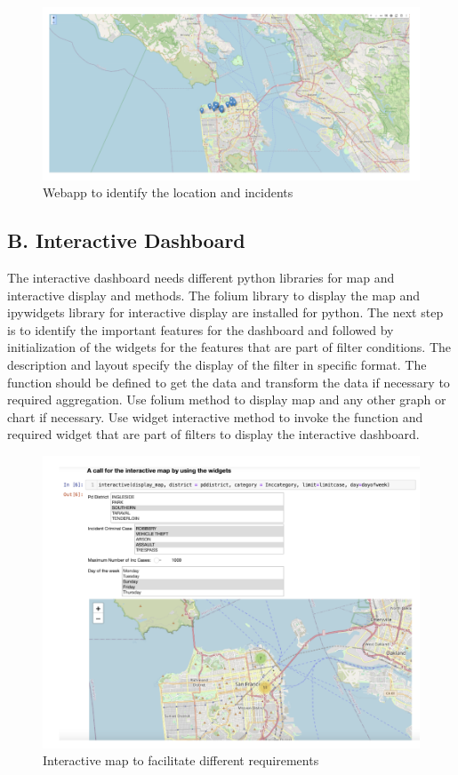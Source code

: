 \documentclass[conference,final,]{IEEEtran}
\begin{document}
\begin{figure}

{\centering \includegraphics[width=0.5\linewidth]{img/fig14a} 

}

\caption{Webapp to identify the location and incidents}\label{fig:unnamed-chunk-17}
\end{figure}

\subsection{B. Interactive Dashboard}\label{b.-interactive-dashboard}

The interactive dashboard needs different python libraries for map and
interactive display and methods. The folium library to display the map
and ipywidgets library for interactive display are installed for python.
The next step is to identify the important features for the dashboard
and followed by initialization of the widgets for the features that are
part of filter conditions. The description and layout specify the
display of the filter in specific format. The function should be defined
to get the data and transform the data if necessary to required
aggregation. Use folium method to display map and any other graph or
chart if necessary. Use widget interactive method to invoke the function
and required widget that are part of filters to display the interactive
dashboard.

\begin{figure}

{\centering \includegraphics[width=0.5\linewidth]{img/fig14b} 

}

\caption{Interactive map to facilitate different requirements}\label{fig:unnamed-chunk-18}
\end{figure}
\end{document}
